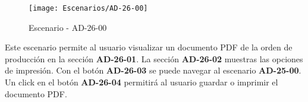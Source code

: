 \begin{figure}[H]
\centering
\texttt{[image: Escenarios/AD-26-00]}
\caption{Escenario - AD-26-00}
\label{fig:AD-26-00}
\end{figure}

Este escenario permite al usuario visualizar un documento PDF de la orden de producción en la sección \textbf{AD-26-01}. La sección \textbf{AD-26-02} muestras las opciones de impresión. Con el botón \textbf{AD-26-03} se puede navegar al escenario \textbf{AD-25-00}. Un click en el botón \textbf{AD-26-04} permitirá al usuario guardar o imprimir el documento PDF.
\clearpage
